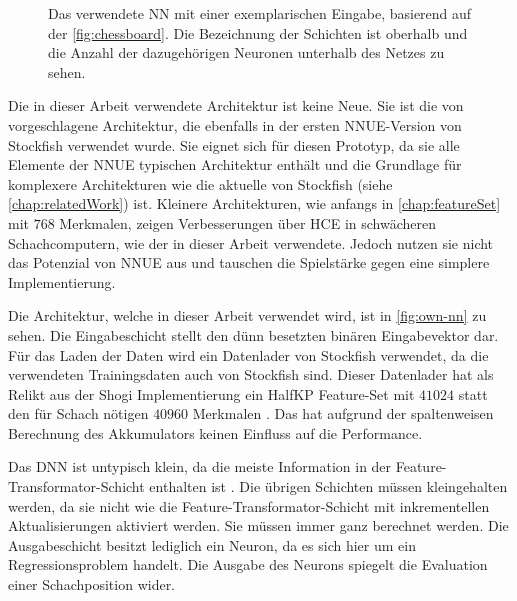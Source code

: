 \begin{figure}
{
  }%
  \caption{Das verwendete \ac{NN} mit einer exemplarischen Eingabe, basierend auf der \autoref{fig:chessboard}. Die Bezeichnung der Schichten ist oberhalb und die Anzahl der dazugehörigen Neuronen unterhalb des Netzes zu sehen.}
  \label{fig:own-nn}
\end{figure}

Die in dieser Arbeit verwendete Architektur ist keine Neue. Sie ist die von \citeauthor{YNasu2018} \cite{YNasu2018} vorgeschlagene Architektur, die ebenfalls in der ersten \ac{NNUE}-Version von Stockfish verwendet wurde. Sie eignet sich für diesen Prototyp, da sie alle Elemente der \ac{NNUE} typischen Architektur enthält und die Grundlage für komplexere Architekturen wie die aktuelle von Stockfish (siehe \autoref{chap:relatedWork}) ist. Kleinere Architekturen, wie anfangs in \autoref{chap:featureSet} mit $768$ Merkmalen, zeigen Verbesserungen über \ac{HCE} in schwächeren Schachcomputern, wie der in dieser Arbeit verwendete. Jedoch nutzen sie nicht das Potenzial von \ac{NNUE} aus und tauschen die Spielstärke gegen eine simplere Implementierung.

Die Architektur, welche in dieser Arbeit verwendet wird, ist in \autoref{fig:own-nn} zu sehen. Die Eingabeschicht stellt den dünn besetzten binären Eingabevektor dar. Für das Laden der Daten wird ein Datenlader von Stockfish verwendet, da die verwendeten Trainingsdaten auch von Stockfish sind. Dieser Datenlader hat als Relikt aus der Shogi Implementierung ein HalfKP Feature-Set mit $41024$ statt den für Schach nötigen $40960$ Merkmalen \cite{StockfishNNUE}. Das hat aufgrund der spaltenweisen Berechnung des Akkumulators keinen Einfluss auf die Performance.

Das \ac{DNN} ist untypisch klein, da die meiste Information in der Feature-Transformator-Schicht enthalten ist \cite{StockfishNNUE}. Die übrigen Schichten müssen kleingehalten werden, da sie nicht wie die Feature-Transformator-Schicht mit inkrementellen Aktualisierungen aktiviert werden. Sie müssen immer ganz berechnet werden. Die Ausgabeschicht besitzt lediglich ein Neuron, da es sich hier um ein Regressionsproblem handelt. Die Ausgabe des Neurons spiegelt die Evaluation einer Schachposition wider.

